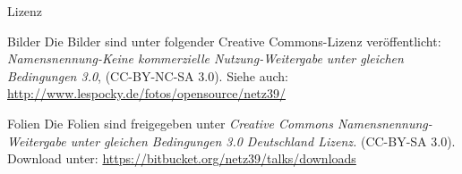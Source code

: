 \documentclass[hyperref={pdfpagelabels=false}]{beamer}
\begin{document}
\begin{frame}{Lizenz}
    \begin{block}{Bilder}
        Die Bilder sind unter folgender Creative Commons-Lizenz
        veröffentlicht: \emph{Namensnennung-Keine kommerzielle
        Nutzung-Weitergabe unter gleichen Bedingungen 3.0}, (CC-BY-NC-SA
        3.0). Siehe auch:
        \url{http://www.lespocky.de/fotos/opensource/netz39/}
    \end{block}
    \begin{block}{Folien}
        Die Folien sind freigegeben unter \emph{Creative Commons
        Namensnennung-Weitergabe unter gleichen Bedingungen 3.0 Deutschland
        Lizenz.} (CC-BY-SA 3.0). Download unter:
        \url{https://bitbucket.org/netz39/talks/downloads}
    \end{block}
\end{frame}
\end{document}
